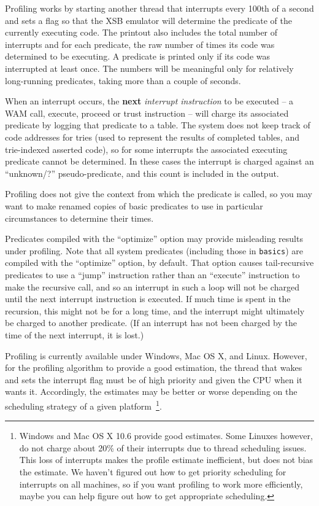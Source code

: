 Profiling works by starting another thread that interrupts every 100th
of a second and sets a flag so that the XSB emulator will determine
the predicate of the currently executing code.  The printout also
includes the total number of interrupts and for each predicate, the
raw number of times its code was determined to be executing.  A
predicate is printed only if its code was interrupted at least once.
The numbers will be meaningful only for relatively long-running
predicates, taking more than a couple of seconds.

%
When an interrupt occurs, the {\bf next} {\em interrupt instruction}
to be executed -- a WAM {\sf call}, {\sf execute}, {\sf proceed} or
{\sf trust} instruction -- will charge its associated predicate by
logging that predicate to a table.  The system does not keep track of
code addresses for tries (used to represent the results of completed
tables, and trie-indexed asserted code), so for some interrupts the
associated executing predicate cannot be determined.  In these cases
the interrupt is charged against an ``unknown/?''  pseudo-predicate,
and this count is included in the output.

Profiling does not give the context from which the predicate is
called, so you may want to make renamed copies of basic predicates to
use in particular circumstances to determine their times.

Predicates compiled with the ``optimize'' option may provide
misleading results under profiling.  Note that all system predicates
(including those in {\tt basics}) are compiled with the ``optimize''
option, by default.  That option causes tail-recursive predicates to
use a ``jump'' instruction rather than an ``execute'' instruction to
make the recursive call, and so an interrupt in such a loop will not
be charged until the next interrupt instruction is executed.  If much
time is spent in the recursion, this might not be for a long time, and
the interrupt might ultimately be charged to another predicate.  (If
an interrupt has not been charged by the time of the next interrupt,
it is lost.)

Profiling is currently available under Windows, Mac OS X, and Linux.
However, for the profiling algorithm to provide a good estimation, the
thread that wakes and sets the interrupt flag must be of high priority
and given the CPU when it wants it.  Accordingly, the estimates may be
better or worse depending on the scheduling strategy of a given
platform~\footnote{Windows and Mac OS X 10.6 provide good estimates.
  Some Linuxes however, do not charge about 20\% of their interrupts
  due to thread scheduling issues.  This loss of interrupts makes the
  profile estimate inefficient, but does not bias the estimate.  We
  haven't figured out how to get priority scheduling for interrupts on
  all machines, so if you want profiling to work more efficiently,
  maybe you can help figure out how to get appropriate scheduling.}.

